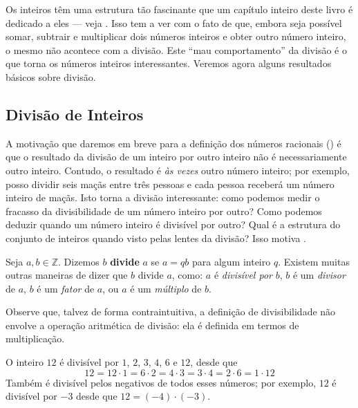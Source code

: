 Os inteiros têm uma estrutura tão fascinante que um capítulo inteiro deste livro é dedicado a eles --- veja . Isso tem a ver com o fato de que, embora seja possível somar, subtrair e multiplicar dois números inteiros e obter outro número inteiro, o mesmo não acontece com a divisão. Este “mau comportamento” da divisão é o que torna os números inteiros interessantes. Veremos agora alguns resultados básicos sobre divisão.


\subsection*{Divisão de Inteiros}
\label{pGettingStartedDivision}

A motivação que daremos em breve para a definição dos números racionais () é que o resultado da divisão de um inteiro por outro inteiro não é necessariamente outro inteiro. Contudo, o resultado é \textit{às vezes} outro número inteiro; por exemplo, posso dividir seis maçãs entre três pessoas e cada pessoa receberá um número inteiro de maçãs. Isto torna a divisão interessante: como podemos medir o fracasso da divisibilidade de um número inteiro por outro? Como podemos deduzir quando um número inteiro é divisível por outro? Qual é a estrutura do conjunto de inteiros quando visto pelas lentes da divisão? Isso motiva .

\begin{definition}
\label{defDivisionPreliminary}
Seja $a,b \in \mathbb{Z}$. Dizemos $b$ \textbf{divide} $a$ se $a=qb$ para algum inteiro $q$. Existem muitas outras maneiras de dizer que $b$ divide $a$, como: $a$ é \textit{divisível por} $b$, $b$ é um \textit{divisor} de $a$, $b $ é um \textit{fator} de $a$, ou $a$ é um \textit{múltiplo} de $b$.
\end{definition}

Observe que, talvez de forma contraintuitiva, a definição de divisibilidade não envolve a operação aritmética de divisão: ela é definida em termos de multiplicação.

\begin{example}
O inteiro $12$ é divisível por $1$, $2$, $3$, $4$, $6$ e $12$, desde que
\[ 12 = 12 \cdot 1 = 6 \cdot 2 = 4 \cdot 3 = 3 \cdot 4 = 2 \cdot 6 = 1 \cdot 12 \]
Também é divisível pelos negativos de todos esses números; por exemplo, $12$ é divisível por $-3$ desde que $12 = (-4) \cdot (-3)$.
\end{example}

